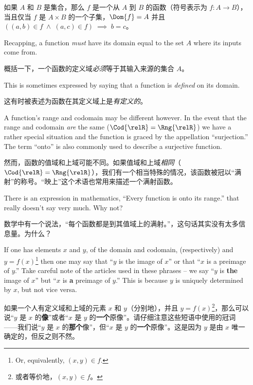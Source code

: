 \begin{defi}
如果 $A$ 和 $B$ 是集合，那么 $f$ 是一个从 $A$ 到 $B$ 的函数（符号表示为 $f:A\longrightarrow B$），当且仅当 $f$ 是 $A\times B$ 的一个子集，$\Dom{f}=A$ 并且 $((a,b) \in f \; \land \; (a,c) \in f) \; \implies \; b=c$。
\end{defi}

Recapping, a function \emph{must} have its domain equal to the set $A$
where its inputs come from.

概括一下，一个函数的定义域\emph{必须}等于其输入来源的集合 $A$。

This is sometimes expressed by saying that
a function is \emph{defined} on its domain.

这有时被表述为函数在其定义域上是\emph{有定义的}。

A function's range and codomain
may be different however.  In the event that the range and codomain \emph{are}
the same ($\Cod{\relR} = \Rng{\relR}$)
we have a rather special situation and the function is graced by
the appellation ``surjection.''  The term ``onto'' is also commonly used
to describe a surjective function.

然而，函数的值域和上域可能不同。如果值域和上域\emph{相同}（$\Cod{\relR} = \Rng{\relR}$），我们有一个相当特殊的情况，该函数被冠以“满射”的称号。“映上”这个术语也常用来描述一个满射函数。

\begin{exer}
There is an expression in mathematics, ``Every function is onto its %
range.'' that really doesn't say very much.  Why not?
\end{exer}

\begin{exer}
数学中有一个说法，“每个函数都是到其值域上的满射。”，这句话其实没有太多信息量。为什么？
\end{exer}

If one has elements $x$ and $y$, of the domain and codomain, (respectively)
and $y = f(x)$\footnote{Or, equivalently, $(x,y) \in f$.} then one may 
say that ``$y$ is the image of $x$'' or that
``$x$ is a preimage of $y$.''  Take careful note of the articles used in
these phrases -- we say  ``$y$ is {\bf the} image of $x$'' but 
``$x$ is {\bf a} preimage of $y$.''  This is because $y$ is uniquely determined
by $x$, but not vice versa.

如果一个人有定义域和上域的元素 $x$ 和 $y$（分别地），并且 $y = f(x)$\footnote{或者等价地，$(x,y) \in f$。}，那么可以说“$y$ 是 $x$ 的\textbf{像}”或者“$x$ 是 $y$ 的\textbf{一个}原像”。请仔细注意这些短语中使用的冠词——我们说“$y$ 是 $x$ 的\textbf{那个}像”，但“$x$ 是 $y$ 的\textbf{一个}原像”。这是因为 $y$ 是由 $x$ 唯一确定的，但反之则不然。


